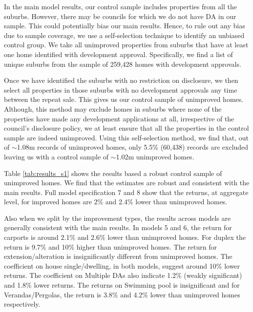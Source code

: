 \documentclass[AEJ,reqno, draftmode]{AEA} %
\begin{document}
In the main model results, our control sample includes properties from all the suburbs. However, there may be councils for which we do not have DA in our sample. This could potentially bias our main results. Hence, to rule out any bias due to sample coverage, we use a self-selection technique to identify an unbiased control group. We take all unimproved properties from suburbs that have at least one home identified with development approval. Specifically, we find a list of unique suburbs from the sample of 259,428 homes with development approvals.

Once we have identified the suburbs with no restriction on disclosure, we then select all properties in those suburbs with no development approvals any time between the repeat sale. This gives us our control sample of unimproved homes. Although, this method may exclude homes in suburbs where none of the properties have made any development applications at all, irrespective of the council's disclosure policy, we at least ensure that all the properties in the control sample are indeed unimproved. Using this self-selection method, we find that, out of $\sim$1.08m records of unimproved homes, only 5.5\% (60,438) records are excluded leaving us with a control sample of $\sim$1.02m unimproved homes. 

Table \ref{tab:results_s1} shows the results based a robust control sample of unimproved homes. We find that the estimates are robust and consistent with the main results. Full model specification 7 and 8 show that the returns, at aggregate level, for improved homes are 2\% and 2.4\% lower than unimproved homes. 

Also when we split by the improvement types, the results across models are generally consistent with the main results. In models 5 and 6, the return for carports is around 2.1\% and 2.6\% lower than unimproved homes. For duplex the return is 9.7\% and 10\% higher than unimproved homes. The return for extension/alteration is insignificantly different from unimproved homes. The coefficient on house single/dwelling, in both models, suggest around 10\% lower returns. The coefficient on Multiple DAs also indicate 1.2\% (weakly significant) and 1.8\% lower returns. The returns on Swimming pool is insignificant and for Verandas/Pergolas, the return is 3.8\% and 4.2\% lower than unimproved homes respectively.
\end{document}
